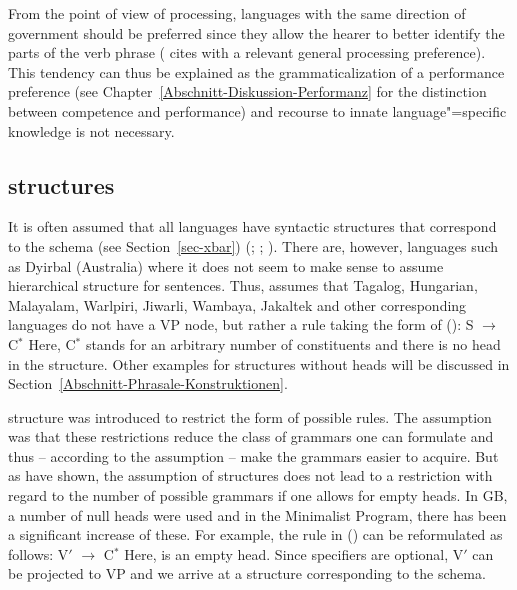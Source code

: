 From the point of view of processing, languages with the same direction of government should be preferred since they allow the hearer to better identify the parts
of the verb phrase (\citet[--221]{Newmeyer2004b} cites 
with a relevant general processing preference). This tendency can thus be explained as the
grammaticalization of a performance preference (see Chapter~\ref{Abschnitt-Diskussion-Performanz}
for the distinction between competence and performance) and recourse to innate language"=specific
knowledge is not necessary.%

\subsection{\xbar structures}
\label{sec-Diskussion-X-Bar}

It is often assumed that all languages have syntactic structures that
correspond to the \xbar schema (see Section~\ref{sec-xbar}) (\citealp[]{Pinker94a}; \citealp[, 14]{Meisel95a}; \citealp[]{PJ2005a}). There are, however, languages such as Dyirbal (Australia) where it does not seem
to make sense to assume hierarchical structure for sentences.
Thus, \citet[]{Bresnan2001a} assumes that Tagalog, Hungarian,
Malayalam, Warlpiri, Jiwarli, Wambaya,
Jakaltek
and other corresponding languages do not have a VP node, but rather a rule taking the form of (): 
\ea
S $\to$ C$^*$
\z
Here, C$^*$ stands for an arbitrary number of constituents and there is no head in the structure.
Other examples for structures without heads will be discussed in Section~\ref{Abschnitt-Phrasale-Konstruktionen}.

\xbar structure was introduced to restrict the form of possible rules. The assumption was that these restrictions reduce the class
of grammars one can formulate and thus -- according to the assumption -- make the grammars easier to
acquire. But as \citet{KP90a} have shown,
the assumption of \xbar structures does not lead to a restriction with regard to the number of possible grammars if one allows for empty heads.
In GB, a number of null heads were used and in the Minimalist Program\indexmp, there has been a
significant increase of these. For example, the rule in () can be reformulated as follows:
\ea
V$'$ $\to$ \vnull C$^*$
\z
Here, \vnull is an empty head. Since specifiers are optional, V$'$ can be projected to VP and we arrive at a structure corresponding to
the \xbar schema.

